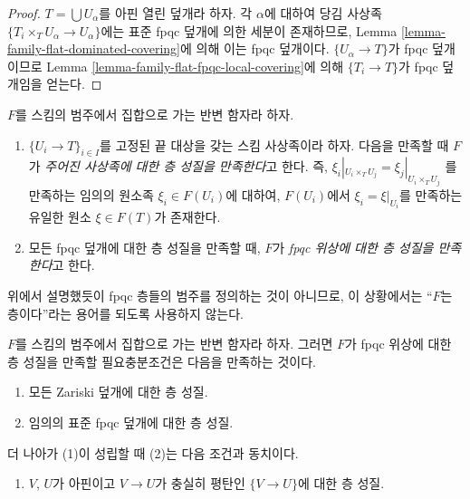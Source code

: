 \begin{proof}
$T = \bigcup U_\alpha$를 아핀 열린 덮개라 하자. 각 $\alpha$에 대하여
당김 사상족 $\{T_i \times_T U_\alpha \to U_\alpha\}$에는 표준 fpqc
덮개에 의한 세분이 존재하므로, Lemma
\ref{lemma-family-flat-dominated-covering}에 의해 이는 fpqc 덮개이다.
$\{U_\alpha \to T\}$가 fpqc 덮개이므로 Lemma
\ref{lemma-family-flat-fpqc-local-covering}에 의해 $\{T_i \to T\}$가 fpqc
덮개임을 얻는다.
\end{proof}

\begin{definition}
\label{definition-sheaf-property-fpqc}
$F$를 스킴의 범주에서 집합으로 가는 반변 함자라 하자.
\begin{enumerate}
\item $\{U_i \to T\}_{i \in I}$를 고정된 끝 대상을 갖는 스킴 사상족이라
하자. 다음을 만족할 때 $F$가 {\it 주어진 사상족에 대한 층 성질을
만족한다}고 한다. 즉,
$\xi_i|_{U_i \times_T U_j} = \xi_j|_{U_i \times_T U_j}$
를 만족하는 임의의 원소족 $\xi_i \in F(U_i)$에 대하여, $F(U_i)$에서
$\xi_i = \xi|_{U_i}$를 만족하는 유일한 원소 $\xi \in F(T)$가 존재한다.
\item 모든 fpqc 덮개에 대한 층 성질을 만족할 때, $F$가
{\it fpqc 위상에 대한 층 성질을 만족한다}고 한다.
\end{enumerate}
\end{definition}

\noindent
위에서 설명했듯이 fpqc 층들의 범주를 정의하는 것이 아니므로, 이 상황에서는
``$F$는 층이다''라는 용어를 되도록 사용하지 않는다.

\begin{lemma}
\label{lemma-sheaf-property-fpqc}
$F$를 스킴의 범주에서 집합으로 가는 반변 함자라 하자. 그러면 $F$가 fpqc
위상에 대한 층 성질을 만족할 필요충분조건은 다음을 만족하는 것이다.
\begin{enumerate}
\item 모든 Zariski 덮개에 대한 층 성질.
\item 임의의 표준 fpqc 덮개에 대한 층 성질.
\end{enumerate}
더 나아가 (1)이 성립할 때 (2)는 다음 조건과 동치이다.
\begin{enumerate}
\item[(2')] $V$, $U$가 아핀이고 $V \to U$가 충실히 평탄인
$\{V \to U\}$에 대한 층 성질.
\end{enumerate}
\end{lemma}

